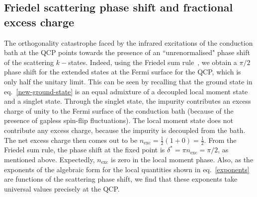 \subsection{Friedel scattering phase shift and fractional excess charge}\label{excess}
The orthogonality catastrophe faced by the infrared excitations of the conduction bath at the QCP points towards the presence of an ``unrenormalised" phase shift~\cite{anderson1990} of the scattering \(k-\)states. Indeed, using the Friedel sum rule~\cite{friedel_1956,langer1961friedel,langreth1966}, we obtain a \(\pi/2\) phase shift for the extended states at the Fermi surface for the QCP, which is only half the unitary limit. This can be seen by recalling that the ground state in eq.~\eqref{new-ground-state} is an equal admixture of a decoupled local moment state and a singlet state. Through the singlet state, the impurity contributes an excess charge of unity to the Fermi surface of the conduction bath (because of the presence of gapless spin-flip fluctuations). The local moment state does not contribute any excess charge, because the impurity is decoupled from the bath. The net excess charge then comes out to be \(n_\text{exc} = \frac{1}{2}\left( 1 + 0 \right) = \frac{1}{2}\). From the Friedel sum rule, the phase shift at the fixed point is \(\delta^* = \pi n_\text{exc} = \pi /2\), as mentioned above. Expectedly, \(n_\text{exc}\) is zero in the local moment phase. Also, as the exponents of the algebraic form for the local quantities shown in eq.~\eqref{exponents} are functions of the scattering phase shift, we find that these exponents take universal values precisely at the QCP.

